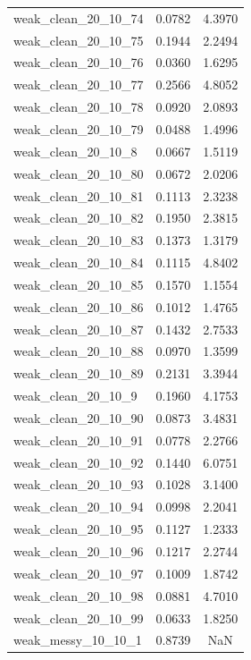 \begin{longtable}{lcc}
weak\_clean\_20\_10\_74    &   0.0782 &  4.3970 \\
weak\_clean\_20\_10\_75    &   0.1944 &  2.2494 \\
weak\_clean\_20\_10\_76    &   0.0360 &  1.6295 \\
weak\_clean\_20\_10\_77    &   0.2566 &  4.8052 \\
weak\_clean\_20\_10\_78    &   0.0920 &  2.0893 \\
weak\_clean\_20\_10\_79    &   0.0488 &  1.4996 \\
weak\_clean\_20\_10\_8     &   0.0667 &  1.5119 \\
weak\_clean\_20\_10\_80    &   0.0672 &  2.0206 \\
weak\_clean\_20\_10\_81    &   0.1113 &  2.3238 \\
weak\_clean\_20\_10\_82    &   0.1950 &  2.3815 \\
weak\_clean\_20\_10\_83    &   0.1373 &  1.3179 \\
weak\_clean\_20\_10\_84    &   0.1115 &  4.8402 \\
weak\_clean\_20\_10\_85    &   0.1570 &  1.1554 \\
weak\_clean\_20\_10\_86    &   0.1012 &  1.4765 \\
weak\_clean\_20\_10\_87    &   0.1432 &  2.7533 \\
weak\_clean\_20\_10\_88    &   0.0970 &  1.3599 \\
weak\_clean\_20\_10\_89    &   0.2131 &  3.3944 \\
weak\_clean\_20\_10\_9     &   0.1960 &  4.1753 \\
weak\_clean\_20\_10\_90    &   0.0873 &  3.4831 \\
weak\_clean\_20\_10\_91    &   0.0778 &  2.2766 \\
weak\_clean\_20\_10\_92    &   0.1440 &  6.0751 \\
weak\_clean\_20\_10\_93    &   0.1028 &  3.1400 \\
weak\_clean\_20\_10\_94    &   0.0998 &  2.2041 \\
weak\_clean\_20\_10\_95    &   0.1127 &  1.2333 \\
weak\_clean\_20\_10\_96    &   0.1217 &  2.2744 \\
weak\_clean\_20\_10\_97    &   0.1009 &  1.8742 \\
weak\_clean\_20\_10\_98    &   0.0881 &  4.7010 \\
weak\_clean\_20\_10\_99    &   0.0633 &  1.8250 \\
weak\_messy\_10\_10\_1     &   0.8739 &     NaN \\

\end{longtable}
